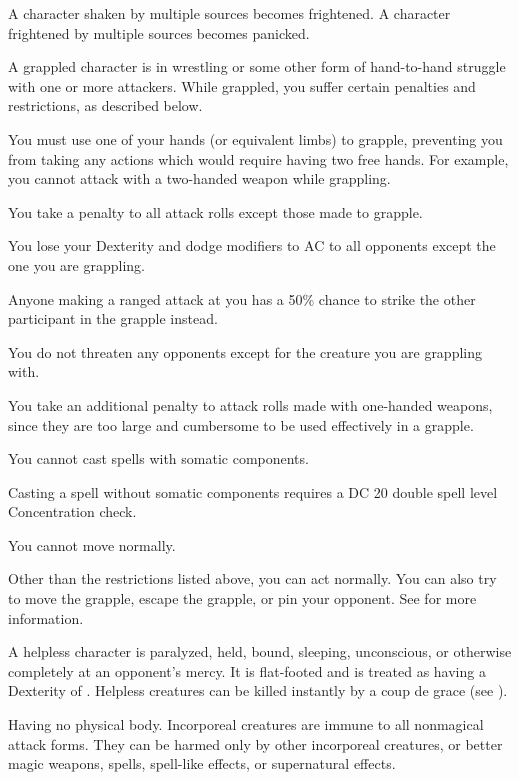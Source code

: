 A character shaken by multiple sources becomes frightened. A character frightened by multiple sources becomes panicked.

 A grappled character is in wrestling or some other form of hand-to-hand struggle with one or more attackers. While grappled, you suffer certain penalties and restrictions, as described below.
\begin{itemize*}
\item You must use one of your hands (or equivalent limbs) to grapple, preventing you from taking any actions which would require having two free hands. For example, you cannot attack with a two-handed weapon while grappling.
\item You take a  penalty to all attack rolls except those made to grapple.
\item You lose your Dexterity and dodge modifiers to AC to all opponents except the one you are grappling.
\item Anyone making a ranged attack at you has a 50\% chance to strike the other participant in the grapple instead.
\item You do not threaten any opponents except for the creature you are grappling with.
\item You take an additional  penalty to attack rolls made with one-handed weapons, since they are too large and cumbersome to be used effectively in a grapple.
\item You cannot cast spells with somatic components.
\item Casting a spell without somatic components requires a DC 20 \add double spell level Concentration check.
\item You cannot move normally.
\end{itemize*}
Other than the restrictions listed above, you can act normally. You can also try to move the grapple, escape the grapple, or pin your opponent. See  for more information.

 A helpless character is paralyzed, held, bound, sleeping, unconscious, or otherwise completely at an opponent's mercy. It is flat-footed and is treated as having a Dexterity of . Helpless creatures can be killed instantly by a coup de grace (see ).

 Having no physical body. Incorporeal creatures are immune to all nonmagical attack forms. They can be harmed only by other incorporeal creatures,  or better magic weapons, spells, spell-like effects, or supernatural effects.


